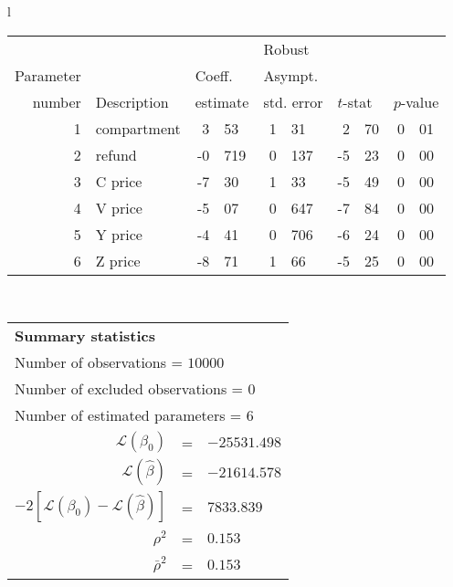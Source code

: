   \begin{tabular}{l}
\begin{tabular}{rlr@{.}lr@{.}lr@{.}lr@{.}l}
         &                       &   \multicolumn{2}{l}{}    & \multicolumn{2}{l}{Robust}  &     \multicolumn{4}{l}{}   \\
Parameter &                       &   \multicolumn{2}{l}{Coeff.}      & \multicolumn{2}{l}{Asympt.}  &     \multicolumn{4}{l}{}   \\
number &  Description                     &   \multicolumn{2}{l}{estimate}      & \multicolumn{2}{l}{std. error}  &   \multicolumn{2}{l}{$t$-stat}  &   \multicolumn{2}{l}{$p$-value}   \\

\hline

1 & compartment & 3&53 & 1&31 & 2&70 & 0&01\\
2 & refund & -0&719 & 0&137 & -5&23 & 0&00\\
3 & C price & -7&30 & 1&33 & -5&49 & 0&00\\
4 & V price & -5&07 & 0&647 & -7&84 & 0&00\\
5 & Y price & -4&41 & 0&706 & -6&24 & 0&00\\
6 & Z price & -8&71 & 1&66 & -5&25 & 0&00\\
\hline
\end{tabular}
\\
\begin{tabular}{rcl}
\multicolumn{3}{l}{\bf Summary statistics}\\
\multicolumn{3}{l}{ Number of observations = $10000$} \\
\multicolumn{3}{l}{ Number of excluded observations = $0$} \\
\multicolumn{3}{l}{ Number of estimated  parameters = $6$} \\
 $\mathcal{L}(\beta_0)$ &=&  $-25531.498$ \\
 $\mathcal{L}(\hat{\beta})$ &=& $-21614.578 $  \\
 $-2[\mathcal{L}(\beta_0) -\mathcal{L}(\hat{\beta})]$ &=& $7833.839$ \\
    $\rho^2$ &=&   $0.153$ \\
    $\bar{\rho}^2$ &=&    $0.153$ \\
\end{tabular}
  \end{tabular}
